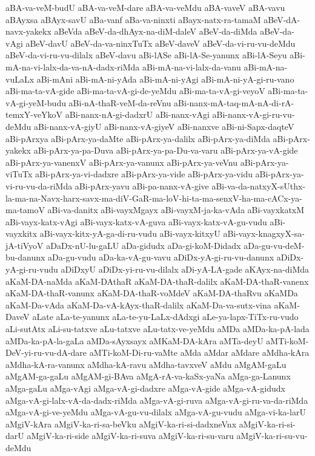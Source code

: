 {aBA-va-veM-budU
aBA-va-veM-dare
aBA-va-veMdu
aBA-vaveV
aBA-vavu
aBAyxsa
aBAyx-savU
aBa-vanf
aBa-va-ninxti
aBayx-natx-ra-tamaM
aBeV-dA-navx-yakekx
aBeVda
aBeV-da-dhAyx-na-diM-daleV
aBeV-da-diMda
aBeV-da-vAgi
aBeV-davU
aBeV-da-va-ninxTuTx
aBeV-daveV
aBeV-da-vi-ru-vu-deMdu
aBeV-da-vi-ru-vu-dilalx
aBeV-davu
aBi-lASe
aBi-lA-Se-yanunx
aBi-lA-Seyu
aBi-mA-na-vi-lalx-da-va-nA-dadx-riMda
aBi-mA-na-vi-lalx-da-vanu
aBi-mA-na-vuLaLx
aBi-mAni
aBi-mA-ni-yAda
aBi-mA-ni-yAgi
aBi-mA-ni-yA-gi-ru-vano
aBi-ma-ta-vA-gide
aBi-ma-ta-vA-gi-de-yeMdu
aBi-ma-ta-vA-gi-veyoV
aBi-ma-ta-vA-gi-yeM-budu
aBi-nA-thaR-veM-da-reVnu
aBi-nanx-mA-taq-mA-nA-di-rA-temxY-veYkoV
aBi-nanx-nA-gi-dadxrU
aBi-nanx-vAgi
aBi-nanx-vA-gi-ru-vu-deMdu
aBi-nanx-vA-giyU
aBi-nanx-vA-giyeV
aBi-nanxve
aBi-ni-Sapx-daqteV
aBi-pArxya
aBi-pArx-ya-daMte
aBi-pArx-ya-dalilx
aBi-pArx-ya-diMda
aBi-pArx-yakekx
aBi-pArx-ya-pa-Duva
aBi-pArx-ya-pa-Du-va-varu
aBi-pArx-ya-vA-gide
aBi-pArx-ya-vanenxV
aBi-pArx-ya-vanunx
aBi-pArx-ya-veVnu
aBi-pArx-ya-viTuTx
aBi-pArx-ya-vi-dadxre
aBi-pArx-ya-vide
aBi-pArx-ya-vidu
aBi-pArx-ya-vi-ru-vu-da-riMda
aBi-pArx-yavu
aBi-pa-nanx-vA-give
aBi-va-da-natxyX-sUthx-la-ma-na-Navx-harx-savx-ma-diV-GaR-ma-loV-hi-ta-ma-senxV-ha-ma-cACx-ya-ma-tamoV
aBi-va-danitx
aBi-vayxMgayx
aBi-vayxM-ja-ka-vAda
aBi-vayxkatxM
aBi-vayx-katx-vAgi
aBi-vayx-katx-vA-guva
aBi-vayx-katx-vA-gu-vudu
aBi-vayxkitx
aBi-vayx-kitx-yA-ga-di-ru-vudu
aBi-vayx-kitxyU
aBi-vayx-knagxyX-sa-jA-tiVyoV
aDaDx-nU-lu-gaLU
aDa-gidudx
aDa-gi-koM-Didadx
aDa-gu-vu-deM-bu-danunx
aDa-gu-vudu
aDa-ka-vA-gu-vavu
aDiDx-yA-gi-ru-vu-danunx
aDiDx-yA-gi-ru-vudu
aDiDxyU
aDiDx-yi-ru-vu-dilalx
aDi-yA-LA-gade
aKAyx-na-diMda
aKaM-DA-naMda
aKaM-DAthaR
aKaM-DA-thaR-dalilx
aKaM-DA-thaR-vanenx
aKaM-DA-thaR-vanunx
aKaM-DA-thaR-voMdeV
aKaM-DA-thaRvu
aKaMDa
aKaM-Da-vAda
aKaM-Da-vA-kAyx-thaR-dalilx
aKaM-Da-va-sutx-vina
aKaM-DaveV
aLate
aLa-te-yanunx
aLa-te-yu-LaLx-dAdxgi
aLe-ya-lapx-TiTx-ru-vudo
aLi-sutAtx
aLi-su-tatxve
aLu-tatxve
aLu-tatx-ve-yeMdu
aMDa
aMDa-ka-pA-lada
aMDa-ka-pA-la-gaLa
aMDa-sAyxsayx
aMKaM-DA-kAra
aMTa-deyU
aMTi-koM-DeV-yi-ru-vu-dA-dare
aMTi-koM-Di-ru-vaMte
aMda
aMdar
aMdare
aMdha-kAra
aMdha-kA-ra-vanunx
aMdha-kA-ravu
aMdha-tavxveV
aMdu
aMgAM-gaLu
aMgAM-ga-gaLu
aMgAM-gi-BAva
aMgA-rA-va-kaSx-yaNa
aMga-ga-Lanunx
aMga-gaLu
aMga-vAgi
aMga-vA-gi-dadxre
aMga-vA-gide
aMga-vA-gidudx
aMga-vA-gi-lalx-vA-da-dadx-riMda
aMga-vA-gi-ruva
aMga-vA-gi-ru-va-da-riMda
aMga-vA-gi-ve-yeMdu
aMga-vA-gu-vu-dilalx
aMga-vA-gu-vudu
aMga-vi-ka-larU
aMgiV-kAra
aMgiV-ka-ri-sa-beVku
aMgiV-ka-ri-si-dadxneVnx
aMgiV-ka-ri-si-darU
aMgiV-ka-ri-side
aMgiV-ka-ri-suva
aMgiV-ka-ri-su-varu
aMgiV-ka-ri-su-vu-deMdu
}
